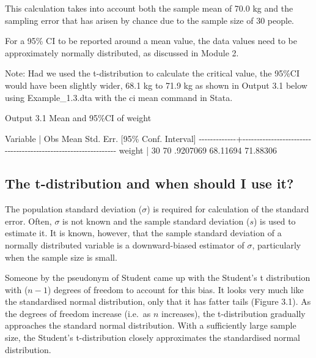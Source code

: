 \documentclass[
]{memoir}
\newenvironment{Shaded}{\begin{snugshade}}{\end{snugshade}}
\newcommand{\NormalTok}[1]{#1}
\begin{document}
This calculation takes into account both the sample mean of 70.0 kg and the sampling error that has arisen by chance due to the sample size of 30 people.

For a 95\% CI to be reported around a mean value, the data values need to be approximately normally distributed, as discussed in Module 2.

Note: Had we used the t-distribution to calculate the critical value, the 95\%CI would have been slightly wider, 68.1 kg to 71.9 kg as shown in Output 3.1 below using Example\_1.3.dta with the ci mean command in Stata.

Output 3.1 Mean and 95\%CI of weight

\begin{Shaded}
\begin{Highlighting}[]
\NormalTok{    Variable |        Obs        Mean    Std. Err.       [95\% Conf. Interval]}
\NormalTok{{-}{-}{-}{-}{-}{-}{-}{-}{-}{-}{-}{-}{-}+{-}{-}{-}{-}{-}{-}{-}{-}{-}{-}{-}{-}{-}{-}{-}{-}{-}{-}{-}{-}{-}{-}{-}{-}{-}{-}{-}{-}{-}{-}{-}{-}{-}{-}{-}{-}{-}{-}{-}{-}{-}{-}{-}{-}{-}{-}{-}{-}{-}{-}{-}{-}{-}{-}{-}{-}{-}{-}{-}{-}{-}{-}{-}}
\NormalTok{      weight |         30          70    .9207069        68.11694    71.88306}
\end{Highlighting}
\end{Shaded}

\hypertarget{the-t-distribution-and-when-should-i-use-it}{%
\subsection{The t-distribution and when should I use it?}\label{the-t-distribution-and-when-should-i-use-it}}

The population standard deviation (\(\sigma\)) is required for calculation of the standard error. Often, \(\sigma\) is not known and the sample standard deviation (\(s\)) is used to estimate it. It is known, however, that the sample standard deviation of a normally distributed variable is a downward-biased estimator of \(\sigma\), particularly when the sample size is small.

Someone by the pseudonym of Student came up with the Student's t distribution with (\(n-1\)) degrees of freedom to account for this bias. It looks very much like the standardised normal distribution, only that it has fatter tails (Figure 3.1). As the degrees of freedom increase (i.e.~as \(n\) increases), the t-distribution gradually approaches the standard normal distribution. With a sufficiently large sample size, the Student's t-distribution closely approximates the standardised normal distribution.
\end{document}
